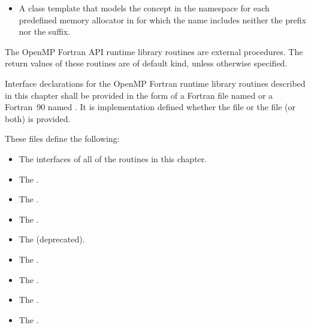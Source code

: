 \begin{cppspecific}
\begin{itemize}
 \item A class template that models the  concept in the  namespace for each predefined memory allocator in  for which the name includes neither the  prefix nor the  suffix.
\end{itemize}
\end{cppspecific}


\begin{fortranspecific}
The OpenMP Fortran API runtime library routines are external procedures. The return
values of these routines are of default kind, unless otherwise specified.

Interface declarations for the OpenMP Fortran runtime library routines described in this
chapter shall be provided in the form of a Fortran  file named  or
a Fortran~90  named . It is implementation defined whether the
 file or the  file (or both) is provided.

These files define the following:

\begin{itemize}
\item The interfaces of all of the routines in this chapter.

\item The   .

\item The   .

\item The   .

\item The    (deprecated).

\item The   .

\item The   .

\item The   .

\item The   .


\end{itemize}
\end{fortranspecific}

